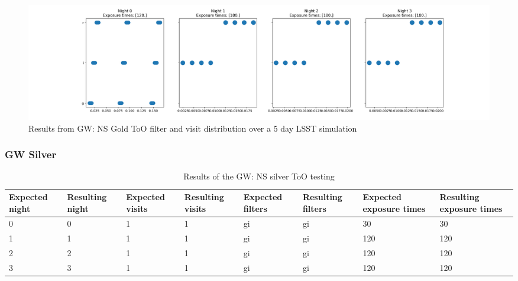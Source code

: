 \begin{figure}
    \centering
    \includegraphics[width=\linewidth]{figures/validationTests/SVRequired/GWGoldFilterPlot.png}
    \caption{Results from GW: NS Gold ToO filter and visit distribution over a 5 day LSST simulation}
    \label{fig:GWGoldFilterResult}
\end{figure}

\clearpage

\subsubsection{GW Silver}

\begin{table}[h!]
\centering
\begin{adjustbox}{max width=\textwidth}
\begin{tabular}{|l|l|l|l|l|l|l|l|}
\hline
Expected night & Resulting night & Expected visits & Resulting visits & Expected filters & Resulting filters & Expected exposure times & Resulting exposure times \\ \hline
0              & 0               & 1               & 1                & gi               & gi                & 30                      & 30                       \\ \hline
1              & 1               & 1               & 1                & gi               & gi                & 120                     & 120                      \\ \hline
2              & 2               & 1               & 1                & gi               & gi                & 120                     & 120                      \\ \hline
3              & 3               & 1               & 1                & gi               & gi                & 120                     & 120                      \\ \hline
\end{tabular}
\end{adjustbox}
\caption{Results of the GW: NS silver ToO testing}
\label{tab:GWSilverResults}
\end{table}

